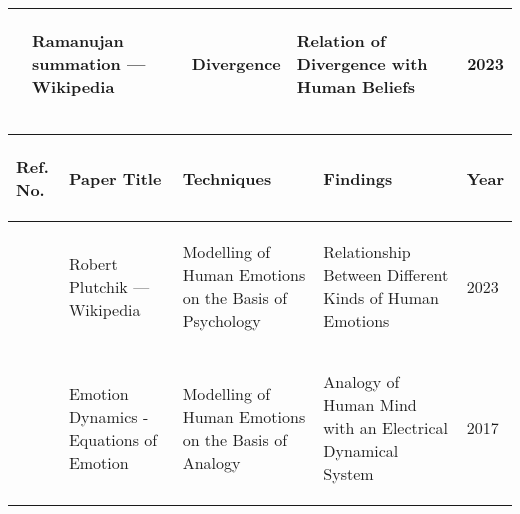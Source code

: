 \begin{tabularx}{\columnwidth}{|X|X|X|X|X|}
	\hline
	\begin{center}\cite{enwiki:1148245424}\end{center} & \begin{center}Ramanujan summation --- {Wikipedia}\end{center} & \begin{center}Divergence\end{center} & \begin{center}Relation of Divergence with Human Beliefs\end{center} & \begin{center}2023\end{center}\\
	\hline
\end{tabularx}
\vspace{2\baselineskip}

\begin{tabularx}{\columnwidth}{|X|X|X|X|X|}
	\hline
	\begin{center}\textbf{Ref. No.}\end{center} & \begin{center}\textbf{Paper Title}\end{center} & \begin{center}\textbf{Techniques}\end{center} & \begin{center}\textbf{Findings}\end{center} & \begin{center}\textbf{Year}\end{center}\\
	\hline
	\begin{center}\cite{enwiki:1136521972}\end{center} & \begin{center}Robert Plutchik --- {Wikipedia}\end{center} & \begin{center}Modelling of Human Emotions on the Basis of Psychology\end{center} & \begin{center}Relationship Between Different Kinds of Human Emotions\end{center} & \begin{center}2023\end{center}\\
	\hline
	\begin{center}\cite{milesresearch}\end{center} & \begin{center}Emotion Dynamics - Equations of Emotion\end{center} & \begin{center}Modelling of Human Emotions on the Basis of Analogy\end{center} & \begin{center}Analogy of Human Mind with an Electrical Dynamical System\end{center} & \begin{center}2017\end{center}\\
	\hline
\end{tabularx}
\vspace{2\baselineskip}

